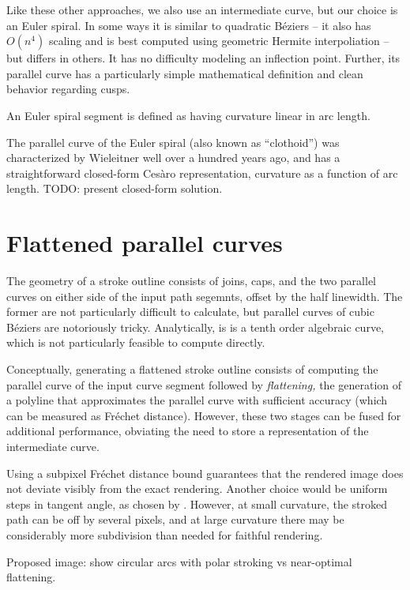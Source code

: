 \documentclass[format=acmsmall]{acmart}
\begin{document}
Like these other approaches, we also use an intermediate curve, but our choice is an Euler spiral. In some ways it is similar to quadratic Béziers -- it also has $O(n^4)$ scaling and is best computed using geometric Hermite interpoliation -- but differs in others. It has no difficulty modeling an inflection point. Further, its parallel curve has a particularly simple mathematical definition and clean behavior regarding cusps.

An Euler spiral segment is defined as having curvature linear in arc length.

The parallel curve of the Euler spiral (also known as ``clothoid'') was characterized by Wieleitner well over a hundred years ago\cite{Wieleitner1907}, and has a straightforward closed-form Cesàro representation, curvature as a function of arc length. TODO: present closed-form solution.

\section{Flattened parallel curves}

The geometry of a stroke outline consists of joins, caps, and the two parallel curves on either side of the input path segemnts, offset by the half linewidth. The former are not particularly difficult to calculate, but parallel curves of cubic Béziers are notoriously tricky. Analytically, is is a tenth order algebraic curve, which is not particularly feasible to compute directly.

Conceptually, generating a flattened stroke outline consists of computing the parallel curve of the input curve segment followed by \emph{flattening,} the generation of a polyline that approximates the parallel curve with sufficient accuracy (which can be measured as Fréchet distance). However, these two stages can be fused for additional performance, obviating the need to store a representation of the intermediate curve.

Using a subpixel Fréchet distance bound guarantees that the rendered image does not deviate visibly from the exact rendering. Another choice would be uniform steps in tangent angle, as chosen by \cite{Kilgard2020}. However, at small curvature, the stroked path can be off by several pixels, and at large curvature there may be considerably more subdivision than needed for faithful rendering.

Proposed image: show circular arcs with polar stroking vs near-optimal flattening.
\end{document}
